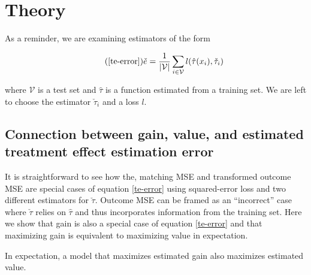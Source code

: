\section{Theory}
\label{theory}

As a reminder, we are examining estimators of the form

\begin{equation}
\tag{\ref{te-error}}
\check e = \frac{1}{|\mathcal{V}|}\sum_{i \in \mathcal{V}} l(\hat \tau (x_i), \check \tau_i)
\end{equation}

where $\mathcal V$ is a test set and $\hat\tau$ is a function estimated from a training set. We are left to choose the estimator $\check\tau_i$ and a loss $l$.

\subsection{Connection between gain, value, and estimated treatment effect estimation error}

It is straightforward to see how the, matching MSE and transformed outcome MSE are special cases of equation \ref{te-error} using squared-error loss and two different estimators for $\check\tau$. Outcome MSE can be framed as an ``incorrect'' case where $\check\tau$ relies on $\hat\tau$ and thus incorporates information from the training set. Here we show that gain is also a special case of equation \ref{te-error} and that maximizing gain is equivalent to maximizing value in expectation.

\begin{theorem}
\label{gain-value}
In expectation, a model that maximizes estimated gain also maximizes estimated value.
\end{theorem}

